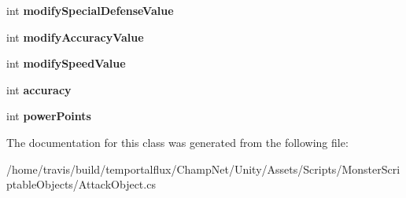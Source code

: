 \begin{DoxyCompactItemize}
\item 
\hypertarget{class_attack_object_a9c37f05dd050b329015be746fa69d650}{int {\bfseries modify\-Special\-Defense\-Value}}\label{class_attack_object_a9c37f05dd050b329015be746fa69d650}

\item 
\hypertarget{class_attack_object_abb0bed3e74f1afd7579bcc3b01097b21}{int {\bfseries modify\-Accuracy\-Value}}\label{class_attack_object_abb0bed3e74f1afd7579bcc3b01097b21}

\item 
\hypertarget{class_attack_object_a82f771a9ec05578c962a9570c4576efd}{int {\bfseries modify\-Speed\-Value}}\label{class_attack_object_a82f771a9ec05578c962a9570c4576efd}

\item 
\hypertarget{class_attack_object_a1950a855161b9b8e1070c355e909af97}{int {\bfseries accuracy}}\label{class_attack_object_a1950a855161b9b8e1070c355e909af97}

\item 
\hypertarget{class_attack_object_ae464864616e42f31c5b3a04bff282957}{int {\bfseries power\-Points}}\label{class_attack_object_ae464864616e42f31c5b3a04bff282957}

\end{DoxyCompactItemize}


The documentation for this class was generated from the following file\-:\begin{DoxyCompactItemize}
\item 
/home/travis/build/temportalflux/\-Champ\-Net/\-Unity/\-Assets/\-Scripts/\-Monster\-Scriptable\-Objects/Attack\-Object.\-cs\end{DoxyCompactItemize}
